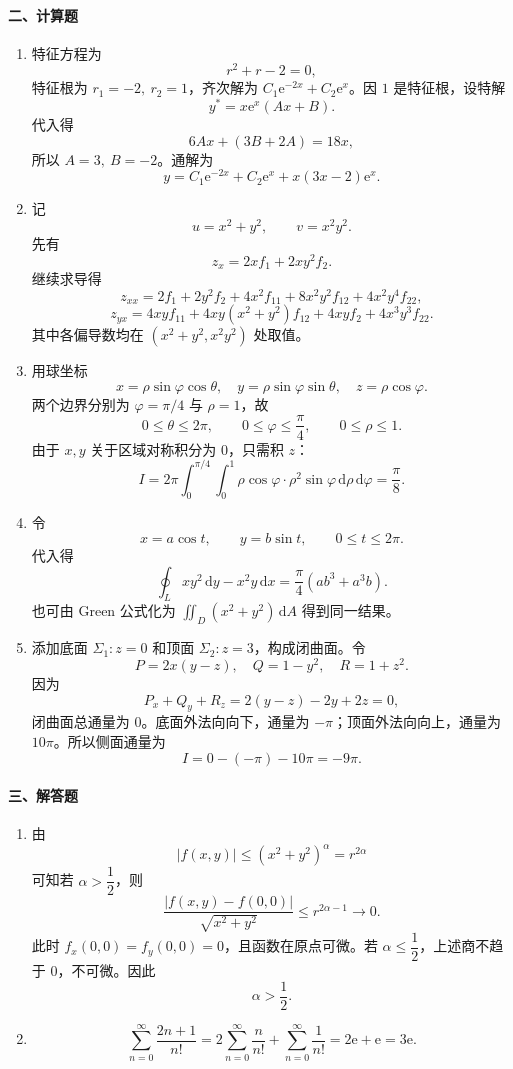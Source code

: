 \paragraph*{二、计算题}
\begin{enumerate}
  \item 特征方程为
  \[
    r^2+r-2=0,
  \]
  特征根为 \(r_1=-2,\ r_2=1\)，齐次解为 \(C_1\mathrm{e}^{-2x}+C_2\mathrm{e}^x\)。因 \(1\) 是特征根，设特解
  \[
    y^*=x\mathrm{e}^x(Ax+B).
  \]
  代入得
  \[
    6Ax+(3B+2A)=18x,
  \]
  所以 \(A=3,\ B=-2\)。通解为
  \[
    y=C_1\mathrm{e}^{-2x}+C_2\mathrm{e}^x+x(3x-2)\mathrm{e}^x.
  \]

  \item 记
  \[
    u=x^2+y^2,\qquad v=x^2y^2.
  \]
  先有
  \[
    z_x=2xf_1+2xy^2f_2.
  \]
  继续求导得
  \[
    z_{xx}=2f_1+2y^2f_2+4x^2f_{11}+8x^2y^2f_{12}+4x^2y^4f_{22},
  \]
  \[
    z_{yx}=4xyf_{11}+4xy(x^2+y^2)f_{12}+4xyf_2+4x^3y^3f_{22}.
  \]
  其中各偏导数均在 \((x^2+y^2,x^2y^2)\) 处取值。

  \item 用球坐标
  \[
    x=\rho\sin\varphi\cos\theta,\quad
    y=\rho\sin\varphi\sin\theta,\quad
    z=\rho\cos\varphi.
  \]
  两个边界分别为 \(\varphi=\pi/4\) 与 \(\rho=1\)，故
  \[
    0\le\theta\le2\pi,\qquad 0\le\varphi\le\frac{\pi}{4},\qquad 0\le\rho\le1.
  \]
  由于 \(x,y\) 关于区域对称积分为 \(0\)，只需积 \(z\)：
  \[
    I=2\pi\int_0^{\pi/4}\int_0^1 \rho\cos\varphi\cdot\rho^2\sin\varphi\,\mathrm{d}\rho\,\mathrm{d}\varphi
    =\frac{\pi}{8}.
  \]

  \item 令
  \[
    x=a\cos t,\qquad y=b\sin t,\qquad 0\le t\le2\pi.
  \]
  代入得
  \[
    \oint_L xy^2\,\mathrm{d}y-x^2y\,\mathrm{d}x
    =\frac{\pi}{4}\left(ab^3+a^3b\right).
  \]
  也可由 Green 公式化为 \(\iint_D(x^2+y^2)\,\mathrm{d}A\) 得到同一结果。

  \item 添加底面 \(\Sigma_1:z=0\) 和顶面 \(\Sigma_2:z=3\)，构成闭曲面。令
  \[
    P=2x(y-z),\quad Q=1-y^2,\quad R=1+z^2.
  \]
  因为
  \[
    P_x+Q_y+R_z=2(y-z)-2y+2z=0,
  \]
  闭曲面总通量为 \(0\)。底面外法向向下，通量为 \(-\pi\)；顶面外法向向上，通量为 \(10\pi\)。所以侧面通量为
  \[
    I=0-(-\pi)-10\pi=-9\pi.
  \]
\end{enumerate}

\paragraph*{三、解答题}
\begin{enumerate}
  \item 由
  \[
    |f(x,y)|\le (x^2+y^2)^\alpha=r^{2\alpha}
  \]
  可知若 \(\alpha>\dfrac12\)，则
  \[
    \frac{|f(x,y)-f(0,0)|}{\sqrt{x^2+y^2}}\le r^{2\alpha-1}\to0.
  \]
  此时 \(f_x(0,0)=f_y(0,0)=0\)，且函数在原点可微。若 \(\alpha\le\dfrac12\)，上述商不趋于 \(0\)，不可微。因此
  \[
    \alpha>\frac12.
  \]

  \item
  \[
    \sum_{n=0}^{\infty}\frac{2n+1}{n!}
    =2\sum_{n=0}^{\infty}\frac{n}{n!}+\sum_{n=0}^{\infty}\frac1{n!}
    =2\mathrm{e}+\mathrm{e}=3\mathrm{e}.
  \]
\end{enumerate}

